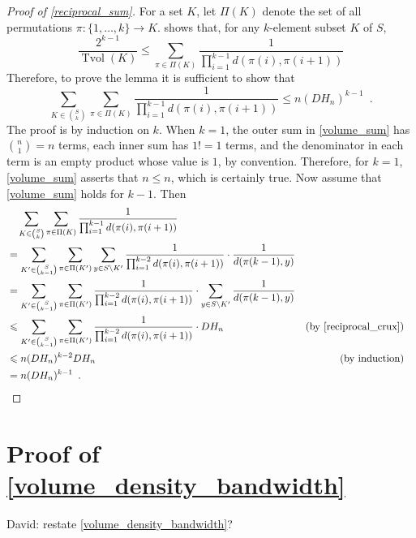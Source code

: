 \documentclass{patmorin}
\renewcommand{\le}{\leqslant}
\newcommand{\david}[1]{{\color{orange} David: #1}}
\DeclareMathOperator{\tvol}{Tvol}
\begin{document}
\begin{proof}[Proof of \cref{reciprocal_sum}]
  For a set $K$, let $\Pi(K)$ denote the set of all permutations $\pi:\{1,\ldots,k\}\to K$.
  \citet[Lemma~17]{feige:approximating} shows that, for any $k$-element subset $K$ of $S$,
  \[
    \frac{2^{k-1}}{\tvol(K)} \le \sum_{\pi\in\Pi(K)}\frac{1}{\prod_{i=1}^{k-1}d(\pi(i),\pi(i+1))}
  \]
  Therefore, to prove the lemma it is sufficient to show that
  \begin{equation}
    \sum_{K\in\binom{S}{k}}\sum_{\pi\in\Pi(K)}\frac{1}{\prod_{i=1}^{k-1}d(\pi(i),\pi(i+1))} \le n(DH_n)^{k-1} \enspace .
    \label{volume_sum}
  \end{equation}
  The proof is by induction on $k$.  When $k=1$, the outer sum in \cref{volume_sum} has $\binom{n}{1}=n$ terms, each inner sum has $1!=1$ terms, and the denominator in each term is an empty product whose value is $1$, by convention.  Therefore, for $k=1$, \cref{volume_sum} asserts that $n \le n$, which is certainly true.  Now assume that \cref{volume_sum} holds for $k-1$.  Then
  \begin{align*}
    & \quad \sum_{K\in\binom{S}{k}}\sum_{\pi\in\Pi(K)}\frac{1}{\prod_{i=1}^{k-1}d(\pi(i),\pi(i+1))} \\
    & = \sum_{K'\in\binom{S}{k-1}}\sum_{\pi\in\Pi(K')}\sum_{y\in S\setminus K'}\frac{1}{\prod_{i=1}^{k-2}d(\pi(i),\pi(i+1))}\cdot\frac{1}{d(\pi(k-1),y)} \\
    & = \sum_{K'\in\binom{S}{k-1}}\sum_{\pi\in\Pi(K')}\frac{1}{\prod_{i=1}^{k-2}d(\pi(i),\pi(i+1))}\cdot\sum_{y\in S\setminus K'}\frac{1}{d(\pi(k-1),y)} \\
    & \le \sum_{K'\in\binom{S}{k-1}}\sum_{\pi\in\Pi(K')}\frac{1}{\prod_{i=1}^{k-2}d(\pi(i),\pi(i+1))}\cdot DH_n & \text{(by \cref{reciprocal_crux})}\\
    & \le n(DH_n)^{k-2}DH_n & \text{(by induction)}\\
    & = n(DH_n)^{k-1} \enspace . & & \qedhere
  \end{align*}
\end{proof}

\section{Proof of \cref{volume_density_bandwidth}}
\label{volume_density_bandwidth_section}

\david{restate \cref{volume_density_bandwidth}?}
\end{document}
